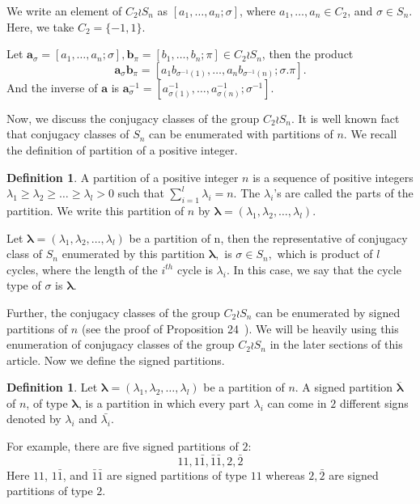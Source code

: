 \documentclass[12pt,twoside,reqno]{amsart}
\theoremstyle{definition}
\newtheorem{definition}[theorem]{Definition}
\numberwithin{equation}{section}
\newcommand{\bmf}[1]{\mathbf{#1}}
\newcommand{\lbd}{\lambda}
\newcommand{\Lbd}{\bm {\lambda}}
\begin{document}
We write an element of $C_2 \wr S_n$ as $[a_1,\ldots,a_n;\sigma]$, where $a_1,\ldots, a_n \in C_2$, and $\sigma \in S_n$. Here, we take $C_2 = \{-1,1\}$. 

Let $\bmf{a}_\sigma = [a_1,\ldots, a_n; \sigma], \bmf{b}_\pi= [b_1, \ldots, b_n; \pi] \in C_2\wr{S_n}$, then the product $$\bmf{a}_\sigma\bmf{b}_\pi=[a_1b_{\sigma^{-1}(1)},\ldots, a_nb_{\sigma^{-1}(n)}; \sigma.\pi].$$
And the inverse of $\bmf{a}$ is $\bmf{a}_\sigma^{-1} = [a^{-1}_{\sigma(1)}, \ldots, a^{-1}_{\sigma(n)}; \sigma^{-1}]$.

Now, we discuss the conjugacy classes of the group $C_2 \wr S_n.$ It is well known fact that conjugacy classes of $S_n$ can be enumerated with partitions of $n.$ We recall the definition of partition of a positive integer. 

\begin{definition}
    A partition of a positive integer $n$ is a sequence of positive integers $\lambda_1 \geq \lambda_2 \geq \dots \geq  \lambda_l >0$ such that $\sum_{i=1}^{l} \lambda_i =n.$ The $\lambda_i$'s are called the parts of the partition. We write this partition of $n$ by $\Lbd = (\lbd_1, \lbd_2,\ldots, \lbd_l).$ 
\end{definition}
Let $\Lbd=(\lbd_1,\lbd_2,…,\lbd_l)$ be a partition of n, then the representative of conjugacy class of $S_n$ enumerated by this partition $\Lbd,$ is $\sigma\in S_n,$ which is product of $l$ cycles, where the length of the $i^{th}$ cycle is $\lbd_i.$ In this case, we say that the cycle type of $\sigma$ is $\Lbd.$


Further, the conjugacy classes of the group $
C_2 \wr S_n$ can be enumerated by signed partitions of $n$ (see the proof of Proposition 24~\cite{Ca}). We will be heavily using this enumeration of conjugacy classes of the group $C_2 \wr S_n$ in the later sections of this article.
Now we define the signed partitions. 


\begin{definition}
Let $\Lbd=(\lbd_1,\lbd_2,…,\lbd_l)$ be a partition of $n$. A signed partition $\overline{\Lbd}$ of $n$, of type $\Lbd$, is a partition in which every part $\lbd_i$ can come in $2$ different signs denoted by $\lbd_i$ and $\bar{\lbd_i}.$   
\end{definition}
For example, there are five signed partitions of $2:$
$$11, 1\bar{1},\bar{1}\bar{1},2, \bar{2}  $$
Here $11$, $1\bar{1}$, and $\bar{1}\bar{1}$ are signed partitions of type $11$ whereas $2, \bar{2}$ are signed partitions of type $2.$ 
\end{document}
